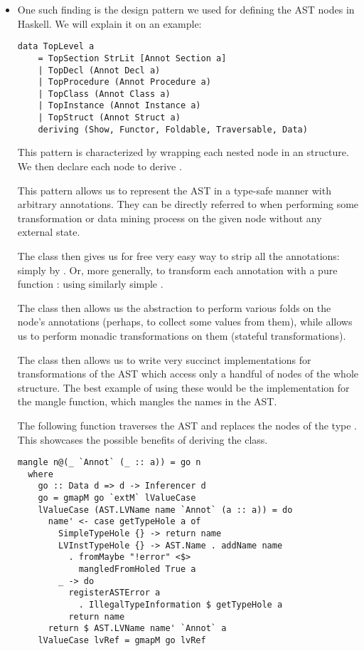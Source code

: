 \begin{itemize}
    \item One such finding is the design pattern we used for defining the AST nodes in Haskell. We will explain it on an example:

    \begin{lstlisting}[style=haskellStyle]
data TopLevel a
    = TopSection StrLit [Annot Section a]
    | TopDecl (Annot Decl a)
    | TopProcedure (Annot Procedure a)
    | TopClass (Annot Class a)
    | TopInstance (Annot Instance a)
    | TopStruct (Annot Struct a)
    deriving (Show, Functor, Foldable, Traversable, Data)
    \end{lstlisting}

    This pattern is characterized by wrapping each nested node  in an  structure. We then declare each node to derive \linebreak{}.

    This pattern allows us to represent the AST in a type-safe manner with arbitrary annotations. They can be directly referred to when performing some transformation or data mining process on the given node without  any external state.

    The  class then gives us for free very easy way to strip all the annotations: simply by . Or, more generally, to transform each annotation with a pure function : using similarly simple .

    The  class then allows us the abstraction to perform various folds on the node's annotations (perhaps, to collect some values from them), while  allows us to perform monadic transformations on them (stateful transformations).

    The  class then allows us to write very succinct implementations for transformations of the AST which access only a handful of nodes of the whole structure. The best example of using these would be the implementation for the mangle function, which mangles the names in the AST.

    \begin{ex}
        The following function traverses the AST and replaces the nodes of the type . This showcases the possible benefits of deriving the  class.

        \begin{lstlisting}[style=haskellStyle]
mangle n@(_ `Annot` (_ :: a)) = go n
  where
    go :: Data d => d -> Inferencer d
    go = gmapM go `extM` lValueCase
    lValueCase (AST.LVName name `Annot` (a :: a)) = do
      name' <- case getTypeHole a of
        SimpleTypeHole {} -> return name
        LVInstTypeHole {} -> AST.Name . addName name
          . fromMaybe "!error" <$>
            mangledFromHoled True a
        _ -> do
          registerASTError a
            . IllegalTypeInformation $ getTypeHole a
          return name
      return $ AST.LVName name' `Annot` a
    lValueCase lvRef = gmapM go lvRef
        \end{lstlisting}


\end{ex}
\end{itemize}
